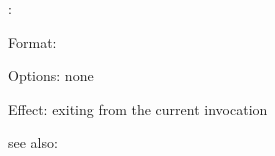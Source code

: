 \bye:

Format: 

Options: none

Effect: exiting from the current \RELFUN{} invocation 

see also: \relfun
